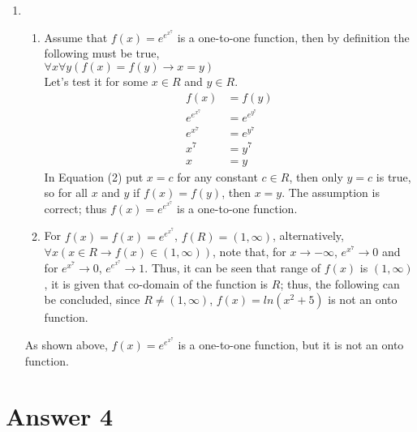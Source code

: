 \documentclass[12pt]{article}
\begin{document}
\begin{enumerate}
\item
    \begin{enumerate}
        \item Assume that $f(x) = e^{e^{x^7}}$ is a one-to-one function, then by definition the following must be true,\\
        $\forall x \forall y (f(x) = f(y) \rightarrow x = y)$\\
        Let's test it for some $x \in R$ and $y \in R$.\\
        \begin{equation} 
        \label{eq1}
        \begin{split}
            f(x) & = f(y) \\
            e^{e^{x^7}} &= e^{e^{y^7}}\\
            e^{x^7} &= e^{y^7}\\
            x^7 &= y^7\\
            x &= y
        \end{split}
        \end{equation}
        In Equation (2) put $x = c$ for any constant $c \in R$, then only $y = c$ is true, so for all $x$ and $y$ if $f(x) = f(y)$, then $x = y$. The assumption is correct; thus $f(x) = e^{e^{x^7}}$ is a one-to-one function.

        \item For $f(x) = f(x) = e^{e^{x^7}}$, $f(R) = (1, \infty)$, alternatively, $\forall x (x \in R \rightarrow f(x) \in (1, \infty))$, note that, for $x \to -\infty$, $e^{x^7} \to 0$ and for $e^{x^7} \to 0$, $e^{e^{x^7}} \to 1$. Thus, it can be seen that range of $f(x)$ is $(1, \infty)$, it is given that co-domain of the function is $R$; thus, the following can be concluded, since $R \neq (1, \infty)$, $f(x) = ln(x^2 + 5)$ is not an onto function.
    \end{enumerate}
    As shown above, $f(x) = e^{e^{x^7}}$ is a one-to-one function, but it is not an onto function.
    
\end{enumerate}


\section*{Answer 4}
\end{document}
